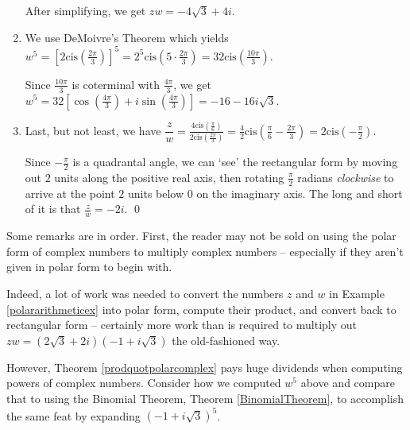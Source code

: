 \documentclass{ximera}
\begin{document}
\begin{example}
\begin{enumerate}
\smallskip

 After simplifying, we get $zw = -4\sqrt{3} + 4i$.

\item We use DeMoivre's Theorem which yields $w^{5} = \left[2\text{cis}\left(\frac{2\pi}{3}\right)\right]^{5} = 2^{5} \text{cis} \left(5\cdot \frac{2\pi}{3}\right) = 32 \text{cis}\left(\frac{10\pi}{3}\right)$.  

\smallskip

Since $\frac{10\pi}{3}$ is coterminal with $\frac{4\pi}{3}$, we get $w^{5} = 32\left[ \cos\left(\frac{4\pi}{3}\right) + i\sin\left(\frac{4\pi}{3}\right) \right] = -16-16i\sqrt{3}$.

\item  Last, but not least, we have $\dfrac{z}{w} = \frac{4 \text{cis}\left(\frac{\pi}{6}\right)}{2\text{cis}\left(\frac{2\pi}{3}\right)} = \frac{4}{2} \text{cis}\left(\frac{\pi}{6} - \frac{2\pi}{3}\right) = 2\text{cis}\left(-\frac{\pi}{2}\right)$.  

\smallskip

Since $-\frac{\pi}{2}$ is a quadrantal angle, we can `see' the rectangular form by moving out $2$ units along the positive real axis, then rotating $\frac{\pi}{2}$ radians \textit{clockwise} to arrive at the point $2$ units below $0$ on the imaginary axis.  The long and short of it is that $\frac{z}{w} = -2i$. \qed

\end{enumerate}

\end{example}

Some remarks are in order.  First, the reader may not be sold on using the polar form of complex numbers to multiply complex numbers -- especially if they aren't given in polar form to begin with. 

\smallskip

Indeed, a lot of work was needed to convert the numbers $z$ and $w$ in Example \ref{polararithmeticex} into polar form, compute their product, and convert back to rectangular form -- certainly more work than is required to multiply out $zw =  (2\sqrt{3} + 2i)(-1 + i\sqrt{3})$ the old-fashioned way.  

\smallskip

However, Theorem \ref{prodquotpolarcomplex} pays huge dividends when computing powers of complex numbers.  Consider how we computed $w^{5}$ above and compare that to using the Binomial Theorem, Theorem \ref{BinomialTheorem}, to accomplish the same feat by expanding  $(-1 + i\sqrt{3})^{5}$. 
\end{document}
